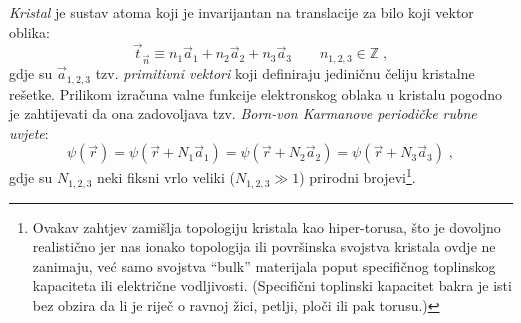 \emph{Kristal} je sustav atoma koji je invarijantan na translacije 
za bilo koji vektor oblika:
\begin{equation}
  \vec{t}_{\vec{n}} \equiv n_1 \vec{a}_1 + n_2 \vec{a}_2 
  + n_3  \vec{a}_3 \qquad n_{1,2,3}\in\mathbb{Z}\;,
\label{tn}
\end{equation}
gdje su $\vec{a}_{1,2,3}$ tzv. \emph{primitivni vektori} koji definiraju
jediničnu čeliju kristalne rešetke. Prilikom izračuna valne funkcije 
elektronskog
oblaka u kristalu pogodno je zahtijevati da ona zadovoljava tzv.
\emph{Born-von Karmanove periodičke rubne uvjete}:
\begin{equation}
 \psi(\vec{r}) = \psi(\vec{r} + N_1 \vec{a}_1)= \psi(\vec{r} + N_2 \vec{a}_2)
= \psi(\vec{r} + N_3 \vec{a}_3) \;,
\end{equation}
gdje su $N_{1,2,3}$ neki fiksni vrlo veliki ($N_{1,2,3}\gg 1$) prirodni 
brojevi\footnote{
Ovakav zahtjev zamišlja topologiju kristala kao hiper-torusa, što je
dovoljno realistično jer nas ionako topologija ili površinska svojstva
kristala ovdje ne zanimaju, već samo svojstva ``bulk'' materijala poput
specifičnog toplinskog kapaciteta ili električne vodljivosti.
(Specifični toplinski kapacitet bakra je isti bez obzira da li je riječ
o ravnoj žici, petlji, ploči ili pak torusu.)}.

